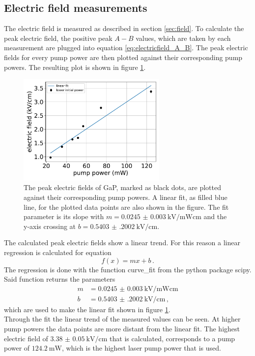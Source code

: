 \subsection{Electric field measurements}
\FloatBarrier
The electric field is measured as described in section \ref{sec:field}.
To calculate the peak electric field, the positive peak $A-B$ values, which are taken by each measurement are plugged into equation \eqref{eq:electricfield_A_B}.
The peak electric fields for every pump power are then plotted against their corresponding pump powers.
The resulting plot is shown in figure \ref{fig:gap_electricfield}.\FloatBarrier
\begin{figure}
    \centering
    \includegraphics[width=0.65\textwidth]{Plots/eltric_field_GaP.pdf}
    \caption{The peak electric fields of GaP, marked as black dots, are plotted against their corresponding pump powers.
    A linear fit, as filled blue line, for the plotted data points are also shown in the figure.
    The fit parameter is its slope with ${m=\SI{0.0245(30)}{\kilo\V\per\milli\W\centi\meter}}$ and the y-axis crossing at ${b=\SI{0.5403(2002)}{\kilo\V\per\centi\meter}}$.}
    \label{fig:gap_electricfield}
\end{figure}\FloatBarrier
The calculated peak electric fields show a linear trend.
For this reason a linear regression is calculated for equation  
\begin{equation}
    f(x) = mx+b \,.
\end{equation}
The regression is done with the function curve\_fit from the python package scipy.
Said function returns the parameters
\begin{align*} 
    m &= \SI{0.0245(30)}{\kilo\V\per\milli\W\centi\meter}\\
    b &= \SI{0.5403(2002)}{\kilo\V\per\centi\meter} \, ,
\end{align*}
which are used to make the linear fit shown in figure \ref{fig:gap_electricfield}.
\\
Through the fit the linear trend of the measured values can be seen.
At higher pump powers the data points are more distant from the linear fit.
The highest electric field of $\SI{3.38(5)}{\kilo\V\per\centi\meter}$ that is calculated, corresponds to a pump power of $\SI{124.2}{\milli\W}$, which is the highest laser pump power that is used.
\FloatBarrier
